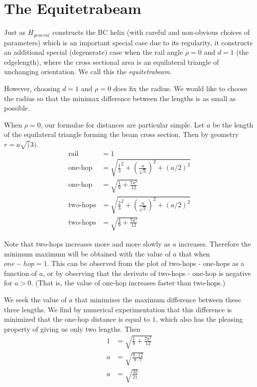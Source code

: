 \documentclass[11pt]{article}
\begin{document}
\section{The Equitetrabeam}

Just as $H_{general}$ constructs the BC helix (with careful and non-obvious choices of parameters) which is an important
special case due to its regularity, it constructs an additional special (degenerate) case when the rail angle $\rho = 0$
and $d = 1$ (the edgelength), where the cross sectional area is an equilateral triangle of unchanging orientation.
We call this the \emph{equitetrabeam}.

However, choosing $d = 1$ and $\rho = 0$ does fix the radius. We would like to choose the radius so that the
minimax difference between the lengths is as small as possible.

When $\rho = 0$, our formulae for distances are particular simple. Let $a$ be the length of the equilateral triangle
forming the beam cross section. Then by geometry $r = a \sqrt(3)$.
\begin{align*}
  \text{rail} &=  1 \\
  \text{one-hop} &= \sqrt{\frac{1}{3}^2 + (\frac{a}{\sqrt{3}})^2 + (a/2)^2}\\
\text{one-hop}  &= \sqrt{\frac{1}{9} + \frac{7 a^2}{12}} \\
    \text{two-hops} &= \sqrt{\frac{2}{3}^2 + (\frac{a}{\sqrt{3}})^2 + (a/2)^2}  \\
\text{two-hops}    &= \sqrt{\frac{4}{9} + \frac{7 a^2}{12}}
\end{align*}

Note that two-hops increases more and more slowly as $a$ increases. Therefore the minimum maximum will
be obtained with the value of $a$ that when $one-hop = 1$. This can be observed from the
plot of two-hops - one-hops as a function of $a$, or by observing that the derivate of two-hops - one-hop
is negative for $a > 0$. (That is, the value of one-hop increases faster than two-hops.) 


We seek the value of $a$ that minimizes the maximum difference between these three lengths. We find
by numerical experimentation that this difference is minimized that the one-hop distance is equal to $1$,
which also has the pleasing property of giving us only two lengths. Then
\begin{align*}
   1  &=  \sqrt{\frac{1}{9} + \frac{7a^2}{12}} \\
     a  &=  \sqrt{\frac{8 \cdot 12}{9 \cdot 7}} \\
          a  &=  \sqrt{\frac{32}{21}}
\end{align*}
\end{document}
